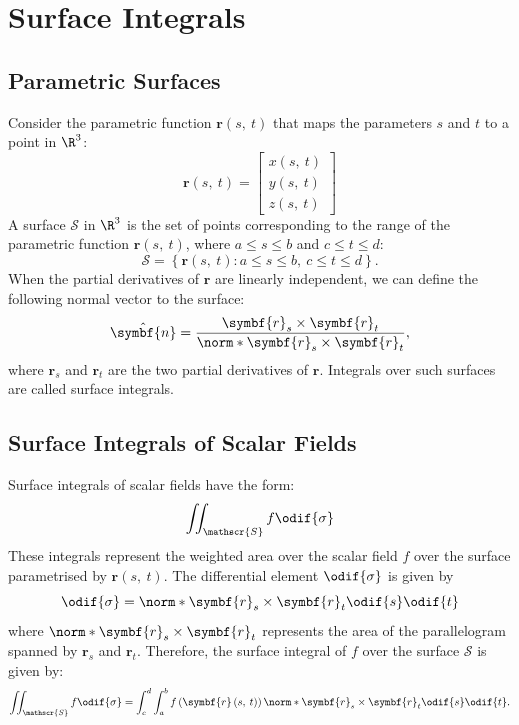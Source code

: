 \documentclass{article}
\begin{document}
\section{Surface Integrals}
\subsection{Parametric Surfaces}
Consider the parametric function \(\symbf{r}\left( s,\: t \right)\)
that maps the parameters \(s\) and \(t\) to a point in \(\R^3\):
\begin{equation*}
    \symbf{r}\left( s,\: t \right) =
    \begin{bmatrix}
        x\left( s,\: t \right) \\
        y\left( s,\: t \right) \\
        z\left( s,\: t \right)
    \end{bmatrix}
\end{equation*}
A surface \(\mathscr{S}\) in \(\R^3\) is the set of points corresponding
to the range of the parametric function \(\symbf{r}\left( s,\: t \right)\),
where \(a \leqslant s \leqslant b\) and \(c \leqslant t \leqslant d\):
\begin{equation*}
    \mathscr{S} = \left\{ \symbf{r}\left( s,\: t \right) : a \leqslant s \leqslant b, \: c \leqslant t \leqslant d \right\}.
\end{equation*}
When the partial derivatives of \(\symbf{r}\) are linearly independent,
we can define the following normal vector to the surface:
\begin{equation*}
    \hat{\symbf{n}} = \frac{\symbf{r}_s \times \symbf{r}_t}{\norm*{\symbf{r}_s \times \symbf{r}_t}},
\end{equation*}
where \(\symbf{r}_s\) and \(\symbf{r}_t\) are the two partial
derivatives of \(\symbf{r}\). Integrals over such surfaces are called
surface integrals.
\subsection{Surface Integrals of Scalar Fields}
Surface integrals of scalar fields have the form:
\begin{equation*}
    \iint_{\mathscr{S}} f \odif{\sigma}
\end{equation*}
These integrals represent the weighted area over the scalar field \(f\)
over the surface parametrised by \(\symbf{r}\left( s,\: t \right)\).
The differential element \(\odif{\sigma}\) is given by
\begin{equation*}
    \odif{\sigma} = \norm*{\symbf{r}_s \times \symbf{r}_t} \odif{s} \odif{t}
\end{equation*}
where \(\norm*{\symbf{r}_s \times \symbf{r}_t}\) represents the area of
the parallelogram spanned by \(\symbf{r}_s\) and \(\symbf{r}_t\).
Therefore, the surface integral of \(f\) over the surface \(\mathscr{S}\)
is given by:
\begin{equation*}
    \iint_{\mathscr{S}} f \odif{\sigma} = \int_c^d \int_a^b f\left( \symbf{r}\left( s,\: t \right) \right) \norm*{\symbf{r}_s \times \symbf{r}_t} \odif{s} \odif{t}.
\end{equation*}
\end{document}

